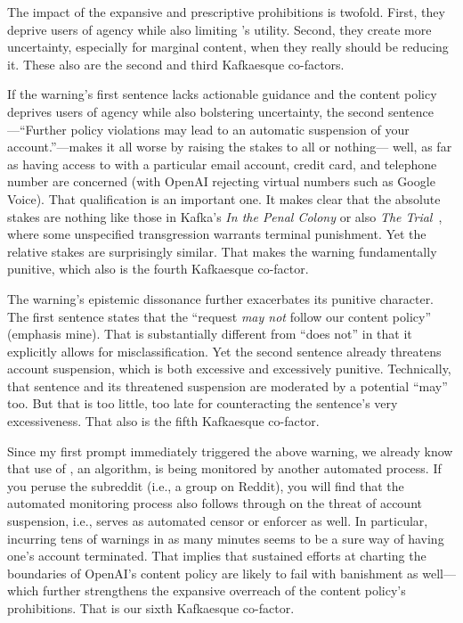 The impact of the expansive and prescriptive prohibitions is twofold. First,
they deprive users of agency while also limiting \DALLE's utility. Second, they
create more uncertainty, especially for marginal content, when they really
should be reducing it. These also are the second and third Kafkaesque
co-factors.

If the warning's first sentence lacks actionable guidance and the content policy
deprives users of agency while also bolstering uncertainty, the second sentence%
---``Further policy violations may lead to an automatic suspension of your
account.''---makes it all worse by raising the stakes to all or nothing---%
well, as far as having access to \DALLE{} with a particular email account,
credit card, and telephone number are concerned (with OpenAI rejecting virtual
numbers such as Google Voice). That qualification is an important one. It makes
clear that the absolute stakes are nothing like those in Kafka's \emph{In the
Penal Colony} or also \emph{The Trial}~\cite{Kafka2005}, where some unspecified
transgression warrants terminal punishment. Yet the relative stakes are
surprisingly similar. That makes the warning fundamentally punitive, which also
is the fourth Kafkaesque co-factor.

The warning's epistemic dissonance further exacerbates its punitive character.
The first sentence states that the ``request \emph{may not} follow our content
policy'' (emphasis mine). That is substantially different from ``does not'' in
that it explicitly allows for misclassification. Yet the second sentence already
threatens account suspension, which is both excessive and excessively punitive.
Technically, that sentence and its threatened suspension are moderated by a
potential ``may'' too. But that is too little, too late for counteracting the
sentence's very excessiveness. That also is the fifth Kafkaesque co-factor.

Since my first prompt immediately triggered the above warning, we already know
that use of \DALLE, an algorithm, is being monitored by another automated
process. If you peruse the \DALLE{} subreddit (i.e., a group on Reddit), you
will find that the automated monitoring process also follows through on the
threat of account suspension, i.e., serves as automated censor or enforcer as
well. In particular, incurring tens of warnings in as many minutes seems to be a
sure way of having one's account terminated. That implies that sustained efforts
at charting the boundaries of OpenAI's content policy are likely to fail with
banishment as well---which further strengthens the expansive overreach of the
content policy's prohibitions. That is our sixth Kafkaesque co-factor.

